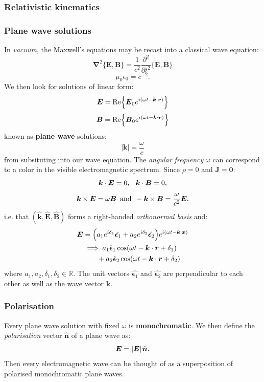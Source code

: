 \documentclass{article}
\newcommand{\vc}[1]{\boldsymbol{#1}}
\begin{document}
\begin{multicols*}{3}
\subsubsection*{Relativistic kinematics}

\subsubsection*{Plane wave solutions}
In \textit{vacuum}, the Maxwell's equations may be recast into
a classical wave equation:
$$\vc{\nabla}^2\{\vc{E},\vc{B}\}=\frac{1}{c^2}
\frac{\partial^2}{\partial t^2}\{\vc{E},\vc{B}\}$$
$$\mu_0\epsilon_0=c^{-2}.$$
We then look for solutions of linear form:
$$\vc{E}=\Re\Bigl\{\vc{E}_0 e^{i(\omega t-\vc{k}\cdot\vc{r})}\Bigr\}$$
$$\vc{B}=\Re\Bigl\{\vc{B}_0 e^{i(\omega t-\vc{k}\cdot\vc{r})}\Bigr\}$$
known as \textbf{plane wave} solutions:
$$|\vc{k}|=\frac{\omega}{c}$$
from subsituting into our wave equation. The \textit{angular
frequency} $\omega$ can correspond to a color in the visible
electromagnetic spectrum.
Since $\rho=0$ and $\vc{J}=\vc{0}$:
$$\vc{k}\cdot\vc{E}=0,\hspace{0.1in}\vc{k}\cdot\vc{B}=0,$$
$$\vc{k}\times\vc{E}=\omega\vc{B}\hspace{0.07in}\text{and}
\hspace{0.07in}-\vc{k}\times\vc{B}=\frac{\omega}{c^2}\vc{E}.$$
i.e. that $(\hat{\vc{k}},\hat{\vc{E}},\hat{\vc{B}})$ forms a
right-handed \textit{orthonormal basis} and:
\begin{align*}
    \vc{E}
    &=\Bigl(a_1 e^{i\delta_1}\hat{\vc{\epsilon}_1}
    +a_2 e^{i\delta_2}\hat{\vc{\epsilon}_2}\Bigr)
    e^{i(\omega t-\vc{k}\cdot\vc{x})} \\
    &\implies 
    a_1\hat{\vc{\epsilon}}_1\cos(\omega t-\vc{k}\cdot\vc{r}+\delta_1) \\
    &\qquad+a_2\hat{\vc{\epsilon}}_2\cos(\omega t-\vc{k}\cdot\vc{r}+\delta_2)
\end{align*}
where $a_1,a_2,\delta_1,\delta_2\in\mathbb{R}$. The unit vectors
$\hat{\vc{\epsilon}_1}$ and $\hat{\vc{\epsilon}_2}$ are
perpendicular to each other as well as the wave vector $\vc{k}$.

\subsubsection*{Polarisation}
Every plane wave solution with fixed $\omega$ is
\textbf{monochromatic}. We then define the \textit{polarisation}
vector $\hat{\vc{n}}$ of a plane wave as:
$$\vc{E}=|\vc{E}|\hspace{0.015in}\hat{\vc{n}}.$$
Then every electromagnetic wave can be thought of
as a superposition of
polarised monochromatic plane waves.


\end{multicols*}
\end{document}
